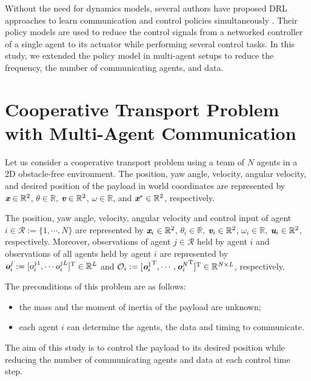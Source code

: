 \documentclass[letterpaper, 10 pt, conference]{ieeeconf} %
\begin{document}
Without the need for dynamics models, several authors have proposed DRL approaches to learn communication and control policies simultaneously \cite{Baumann2018, Funk}.
Their policy models are used to reduce the control signals from a networked controller of a single agent to its actuator while performing several control tasks.
In this study, we extended the policy model \cite{Baumann2018} in multi-agent setups to reduce the frequency, the number of communicating agents, and data.

\section{Cooperative Transport Problem with Multi-Agent Communication}

Let us consider a cooperative transport problem using a team of $N$ agents in a 2D obstacle-free environment.
The position, yaw angle, velocity, angular velocity, and desired position of the payload in world coordinates are represented by $\textit{\textbf{x}}\in \mathbb{R}^2$, $\theta \in \mathbb{R}$, $\textit{\textbf{v}}\in \mathbb{R}^2$, $\omega\in \mathbb{R}$, and $\textit{\textbf{x}}^{\ast} \in \mathbb{R}^2$, respectively.

The position, yaw angle, velocity, angular velocity and control input of agent $i\in \mathcal{R}:=\{ 1,\cdots,N\}$ are represented by $\textit{\textbf{x}}_i\in \mathbb{R}^2$, $\theta_i \in \mathbb{R}$, $\textit{\textbf{v}}_i\in \mathbb{R}^2$, $\omega_i\in \mathbb{R}$, $\textit{\textbf{u}}_i\in \mathbb{R}^2$, respectively. Moreover, observations of agent $j\in \mathcal{R}$ held by agent $i$ and observations of all agents held by agent $i$ are represented by $\textit{\textbf{o}}_i^j:=[o_i^{j1},\cdots o_i^{jL}]^{\rm{T}}\it{}\in\mathbb{R}^{L}$ and $\mathcal{O}_i:=[{\textit{\textbf{o}}_i^{1}}^{\rm{T}}\it{},\cdots,{\textit{\textbf{o}}_i^{N}}^{\rm{T}}]^{\rm{T}}\in \mathbb{R}^{N\times L}$, respectively.

The preconditions of this problem are as follows:
\begin{itemize}
\item the mass and the moment of inertia of the payload are unknown;
\item each agent $i$ can determine the agents, the data and timing to communicate.
\end{itemize}

The aim of this study is to control the payload to its desired position while reducing the number of communicating agents and data at each control time step.
\end{document}
